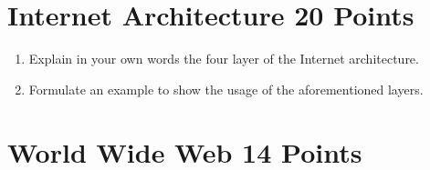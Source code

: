 \documentclass{resources/WeSTassignment}
\begin{document}
\begin{enumerate}
\end{enumerate}

	
\section{Internet Architecture \hfill{20 Points}}
\begin{enumerate}
    \item Explain in your own words the four layer of the Internet architecture.
    \item Formulate an example to show the usage of the aforementioned layers.
\end{enumerate}

\section{World Wide Web \hfill{14 Points}}
\end{document}
